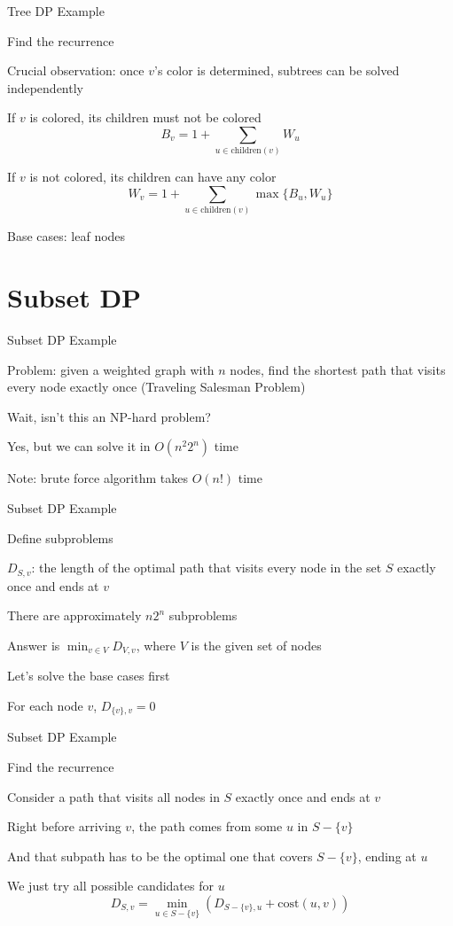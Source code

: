 \documentclass[13pt,onlymath]{beamer}
\begin{document}
\begin{frame}{Tree DP Example}
\BIT
\item Find the recurrence
\BIT
\item Crucial observation: once $v$'s color is determined, subtrees can be solved independently
\item If $v$ is colored, its children must not be colored
\[
B_v = 1 + \sum_{u \in \mathrm{children}(v)} W_u
\]
\item If $v$ is not colored, its children can have any color
\[
W_v = 1 + \sum_{u \in \mathrm{children}(v)} \max\{B_u, W_u\}
\]
\EIT
\vfill
\item Base cases: leaf nodes
\EIT
\end{frame}

\section{Subset DP}

\begin{frame}{Subset DP Example}
\BIT
\item Problem: given a weighted graph with $n$ nodes, find the shortest path that visits every node exactly once (Traveling Salesman Problem)
\vfill
\item Wait, isn't this an NP-hard problem?
\BIT
\item Yes, but we can solve it in $O(n^2 2^n)$ time
\item Note: brute force algorithm takes $O(n!)$ time
\EIT
\EIT
\end{frame}

\begin{frame}{Subset DP Example}
\BIT
\item Define subproblems
\BIT
\item $D_{S, v}$: the length of the optimal path that visits every node in the set $S$ exactly once and ends at $v$
\item There are approximately $n 2^n$ subproblems
\item Answer is $\min_{v \in V} D_{V, v}$, where $V$ is the given set of nodes
\EIT
\vfill
\item Let's solve the base cases first
\BIT
\item For each node $v$, $D_{\{v\}, v} = 0$
\EIT
\EIT
\end{frame}

\begin{frame}{Subset DP Example}
\BIT
\item Find the recurrence
\BIT
\item Consider a path that visits all nodes in $S$ exactly once and ends at $v$
\item Right before arriving $v$, the path comes from some $u$ in $S - \{v\}$
\item And that subpath has to be the optimal one that covers $S-\{v\}$, ending at $u$
\item We just try all possible candidates for $u$
\EIT
\EIT
\vfill
\[
D_{S, v} = \min_{u \in S-\{v\}} \left(D_{S-\{v\}, u} + \mathrm{cost}(u, v) \right)
\]
\end{frame}
\end{document}
